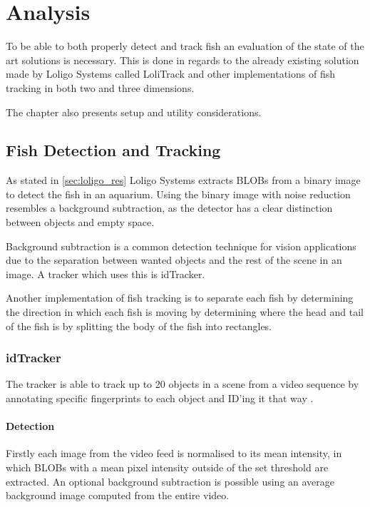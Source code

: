 \graphicspath{{figures/analysis/}}
\chapter{Analysis}\label{ch:analysis}
To be able to both properly detect and track fish an evaluation of the state of the art solutions is necessary. This is done in regards to the already existing solution made by Loligo Systems called LoliTrack and other implementations of fish tracking in both two and three dimensions.

The chapter also presents setup and utility considerations.

\section{Fish Detection and Tracking}\label{sec:det_track}
As stated in \autoref{sec:loligo_res} Loligo Systems extracts BLOBs from a binary image to detect the fish in an aquarium. Using the binary image with noise reduction resembles a background subtraction, as the detector has a clear distinction between objects and empty space.

Background subtraction is a common detection technique for vision applications due to the separation between wanted objects and the rest of the scene in an image. A tracker which uses this is idTracker.

Another implementation of fish tracking is to separate each fish by determining the direction in which each fish is moving by determining where the head and tail of the fish is by splitting the body of the fish into rectangles.

\subsection{idTracker}
The tracker is able to track up to 20 objects in a scene from a video sequence by annotating specific fingerprints to each object and ID'ing it that way \citep{idtracker2014}.

\subsubsection{Detection}
Firstly each image from the video feed is normalised to its mean intensity, in which BLOBs with a mean pixel intensity outside of the set threshold are extracted. An optional background subtraction is possible using an average background image computed from the entire video.

